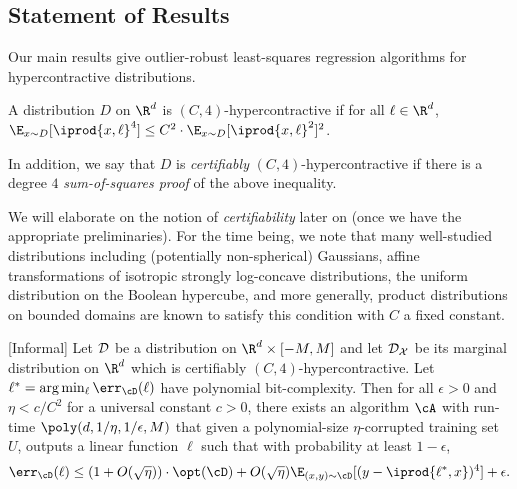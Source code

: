 \subsection{Statement of Results}
Our main results give outlier-robust least-squares regression algorithms for  hypercontractive distributions.  %
\begin{definition}[$4$-Hypercontractivity]
A distribution $D$ on $\R^d$ is $(C,4)$-hypercontractive if for all $\ell \in \R^d$, $\E_{x \sim D}[\iprod{x,\ell}^4] \leq C^2 \cdot \E_{x \sim D}[\iprod{x,\ell}^2]^2$. 

In addition, we say that $D$ is \emph{certifiably} $(C,4)$-hypercontractive if there is a degree $4$ \emph{sum-of-squares proof} of the above inequality.
\end{definition}

We will elaborate on the notion of \emph{certifiability} later on (once we have the appropriate preliminaries). For the time being, we note that many well-studied distributions including (potentially non-spherical) Gaussians, affine transformations of isotropic strongly log-concave distributions, the uniform distribution on the Boolean hypercube, and more generally, product distributions on bounded domains are known to satisfy this condition with $C$ a fixed constant. 


\begin{theorem}\label{th:intro4}[Informal]
Let ${\cal D}$ be a distribution on $\R^{d} \times [-M,M]$ and let ${\cal D_{X}}$ be its
marginal distribution on $\R^d$ which is certifiably $(C,4)$-hypercontractive. Let $\ell^* = \arg\min_{\ell} \err_{\cD}(\ell)$ have polynomial bit-complexity. Then for all $\epsilon > 0$ and $\eta < c/C^2$ for a universal constant $c > 0$,  there exists an algorithm $\cA$ with run-time $\poly(d,1/\eta,1/\epsilon,M)$ that given a polynomial-size $\eta$-corrupted training set $U$, outputs a linear function $\ell$ such that with probability at least  $1-\epsilon$, 
$$\err_{\cD}(\ell) \leq (1 + O(\sqrt{\eta})) \cdot \opt(\cD)  + O(\sqrt{\eta}) \E_{(x,y) \sim \cD}[(y - \iprod{\ell^*,x})^4] + \epsilon.$$

\end{theorem}

